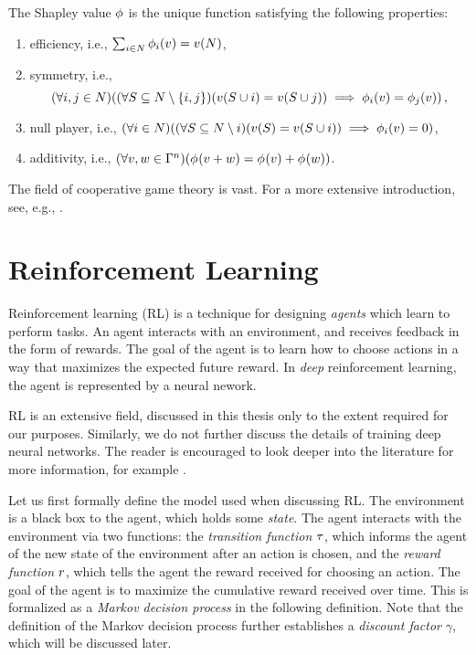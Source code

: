 \begin{prop}
	The Shapley value $ \Shapley $ is the unique function satisfying the following properties: \begin{enumerate}[ ]
		\item efficiency, i.e., $ \sum_{i \in N}^{} \shapley[i]{v} = \fce{v}{N} $,
		\item symmetry, i.e., \[
				\left( \forall i,j \in N \right)\! \left( \left( \forall S \subseteq N \setminus \left\{ i,j \right\} \right)\! \left( \fce{v}{S \cup i} = \fce{v}{S \cup j} \right) \implies \shapley[i]{v} = \shapley[j]{v} \right),
			\]
		\item null player, i.e., $ \left( \forall i \in N \right)\! \left( \left( \forall S \subseteq N \setminus i \right)\! \left( \fce{v}{S} = \fce{v}{S \cup i} \right) \implies \shapley[i]{v} = 0 \right)   $,
		\item additivity, i.e., $ \left( \forall v,w \in \games n \right)\! \left( \shapley{v + w} = \shapley{v} + \shapley{w} \right) $.
	\end{enumerate}
\end{prop}

The field of cooperative game theory is vast.
For a more extensive introduction, see, e.g., \cite{Peleg2007}.

\section{Reinforcement Learning}
\label{sec:rl}

Reinforcement learning (RL) is a technique for designing \emph{agents} which learn to perform tasks.
An agent interacts with an environment, and receives feedback in the form of rewards.
The goal of the agent is to learn how to choose actions in a way that maximizes the expected future reward.
In \emph{deep} reinforcement learning, the agent is represented by a neural nework.

RL is an extensive field, discussed in this thesis only to the extent required for our purposes.
Similarly, we do not further discuss the details of training deep neural networks.
The reader is encouraged to look deeper into the literature for more information, for example \cite{sutton2018reinforcement,bengio2017deep}.

Let us first formally define the model used when discussing RL.
The environment is a black box to the agent, which holds some \emph{state}.
The agent interacts with the environment via two functions: the \emph{transition function} $ \tran $, which informs the agent of the new state of the environment after an action is chosen, and the \emph{reward function} $ \rew $, which tells the agent the reward received for choosing an action.
The goal of the agent is to maximize the cumulative reward received over time.
This is formalized as a \emph{Markov decision process} in the following definition.
Note that the definition of the Markov decision process further establishes a \emph{discount factor} $ \gamma $, which will be discussed later.

